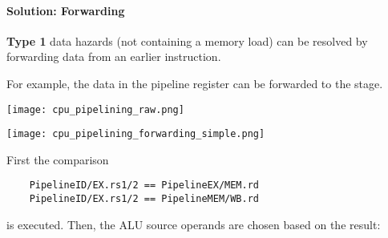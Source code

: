 \paragraph{Solution: Forwarding}
\textbf{Type 1} data hazards (not containing a memory load) can be resolved by forwarding data from an earlier instruction.

\newpar{}
For example, the data in the  pipeline register can be forwarded to the  stage.

\texttt{[image: cpu\_pipelining\_raw.png]}

\begin{center}
    \texttt{[image: cpu\_pipelining\_forwarding\_simple.png]}
\end{center}
First the comparison
\begin{lstlisting}
    PipelineID/EX.rs1/2 == PipelineEX/MEM.rd
    PipelineID/EX.rs1/2 == PipelineMEM/WB.rd
\end{lstlisting}
is executed. Then, the ALU source operands are chosen based on the result:
